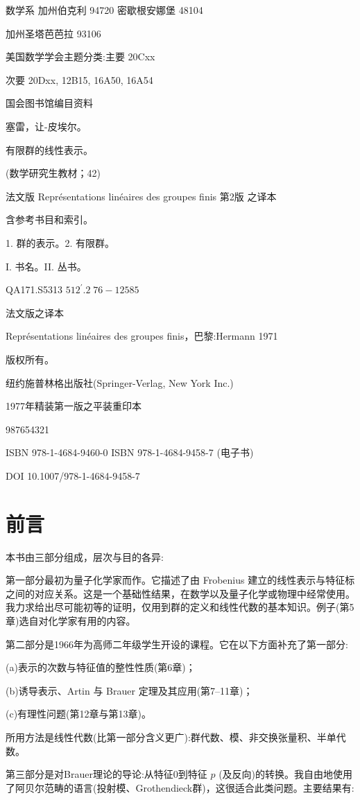 \documentclass[10pt]{article}
\begin{document}
数学系 加州伯克利 94720 密歇根安娜堡 48104

加州圣塔芭芭拉 93106

美国数学学会主题分类:主要 20Cxx

次要 20Dxx, 12B15, 16A50, 16A54

国会图书馆编目资料

塞雷，让-皮埃尔。

有限群的线性表示。

(数学研究生教材；42)

法文版 Représentations linéaires des groupes finis 第2版 之译本

含参考书目和索引。

1. 群的表示。2. 有限群。

I. 书名。II. 丛书。

QA171.S5313 \({512}^{\prime }{.2}\;{76} - {12585}\)

法文版之译本

Représentations linéaires des groupes finis，巴黎:Hermann 1971

版权所有。

  纽约施普林格出版社(Springer-Verlag, New York Inc.)

1977年精装第一版之平装重印本

987654321

ISBN 978-1-4684-9460-0 ISBN 978-1-4684-9458-7 (电子书)

DOI 10.1007/978-1-4684-9458-7

\section*{前言}

本书由三部分组成，层次与目的各异:

第一部分最初为量子化学家而作。它描述了由 Frobenius 建立的线性表示与特征标之间的对应关系。这是一个基础性结果，在数学以及量子化学或物理中经常使用。我力求给出尽可能初等的证明，仅用到群的定义和线性代数的基本知识。例子(第5章)选自对化学家有用的内容。

第二部分是1966年为高师二年级学生开设的课程。它在以下方面补充了第一部分:

(a)表示的次数与特征值的整性性质(第6章)；

(b)诱导表示、Artin 与 Brauer 定理及其应用(第7–11章)；

(c)有理性问题(第12章与第13章)。

所用方法是线性代数(比第一部分含义更广):群代数、模、非交换张量积、半单代数。

第三部分是对Brauer理论的导论:从特征0到特征 \(p\) (及反向)的转换。我自由地使用了阿贝尔范畴的语言(投射模、Grothendieck群)，这很适合此类问题。主要结果有:
\end{document}
